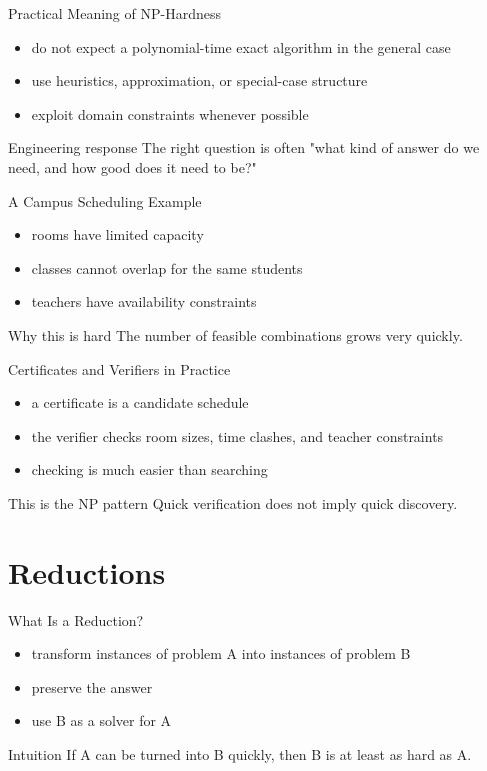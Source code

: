 \documentclass[aspectratio=169,xcolor=dvipsnames]{beamer}
\begin{document}
\begin{frame}{Practical Meaning of NP-Hardness}
  \begin{itemize}
    \item do not expect a polynomial-time exact algorithm in the general case
    \item use heuristics, approximation, or special-case structure
    \item exploit domain constraints whenever possible
  \end{itemize}
  \begin{block}{Engineering response}
    The right question is often "what kind of answer do we need, and how good does it need to be?"
  \end{block}
\end{frame}

\begin{frame}{A Campus Scheduling Example}
  \begin{itemize}
    \item rooms have limited capacity
    \item classes cannot overlap for the same students
    \item teachers have availability constraints
  \end{itemize}
  \begin{alertblock}{Why this is hard}
    The number of feasible combinations grows very quickly.
  \end{alertblock}
\end{frame}

\begin{frame}{Certificates and Verifiers in Practice}
  \begin{itemize}
    \item a certificate is a candidate schedule
    \item the verifier checks room sizes, time clashes, and teacher constraints
    \item checking is much easier than searching
  \end{itemize}
  \begin{exampleblock}{This is the NP pattern}
    Quick verification does not imply quick discovery.
  \end{exampleblock}
\end{frame}

\section{Reductions}
\begin{frame}{What Is a Reduction?}
  \begin{itemize}
    \item transform instances of problem A into instances of problem B
    \item preserve the answer
    \item use B as a solver for A
  \end{itemize}
  \begin{block}{Intuition}
    If A can be turned into B quickly, then B is at least as hard as A.
  \end{block}
\end{frame}
\end{document}
